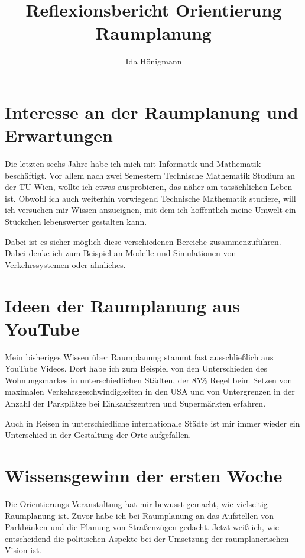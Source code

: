 \documentclass[]{article}
\title{Reflexionsbericht Orientierung Raumplanung}
\author{Ida Hönigmann}
\begin{document}
\maketitle

\begin{abstract}

\end{abstract}

\section{Interesse an der Raumplanung und Erwartungen}
Die letzten sechs Jahre habe ich mich mit Informatik und Mathematik beschäftigt. Vor allem nach zwei Semestern Technische Mathematik Studium an der TU Wien, wollte ich etwas ausprobieren, das näher am tatsächlichen Leben ist. Obwohl ich auch weiterhin vorwiegend Technische Mathematik studiere, will ich versuchen mir Wissen anzueignen, mit dem ich hoffentlich meine Umwelt ein Stückchen lebenswerter gestalten kann.

Dabei ist es sicher möglich diese verschiedenen Bereiche zusammenzuführen. Dabei denke ich zum Beispiel an Modelle und Simulationen von Verkehrssystemen oder ähnliches.

\section{Ideen der Raumplanung aus YouTube}
Mein bisheriges Wissen über Raumplanung stammt fast ausschließlich aus YouTube Videos. Dort habe ich zum Beispiel von den Unterschieden des Wohnungsmarkes in unterschiedlichen Städten, der 85\% Regel beim Setzen von maximalen Verkehrsgeschwindigkeiten in den USA und von Untergrenzen in der Anzahl der Parkplätze bei Einkaufszentren und Supermärkten erfahren.

Auch in Reisen in unterschiedliche internationale Städte ist mir immer wieder ein Unterschied in der Gestaltung der Orte aufgefallen.

\section{Wissensgewinn der ersten Woche}
Die Orientierungs-Veranstaltung hat mir bewusst gemacht, wie vielseitig Raumplanung ist. Zuvor habe ich bei Raumplanung an das Aufstellen von Parkbänken und die Planung von Straßenzügen gedacht. Jetzt weiß ich, wie entscheidend die politischen Aspekte bei der Umsetzung der raumplanerischen Vision ist.
\end{document}
